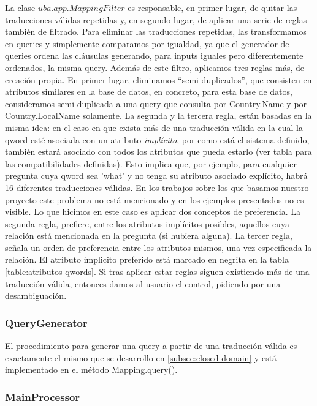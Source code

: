 La clase $uba.app.MappingFilter$ es responsable, en primer lugar, de quitar las traducciones válidas repetidas y, en segundo lugar, de aplicar una serie de reglas también de filtrado. Para eliminar las traducciones repetidas, las transformamos en queries y simplemente comparamos por igualdad, ya que el generador de queries ordena las cláusulas generando, para inputs iguales pero diferentemente ordenados, la misma query.
Además de este filtro, aplicamos tres reglas más, de creación propia. En primer lugar, eliminamos ``semi duplicados'', que consisten en atributos similares en la base de datos, en concreto, para esta base de datos, consideramos semi-duplicada a una query que consulta por Country.Name y por Country.LocalName solamente. La segunda y la tercera regla, están basadas en la misma idea: en el caso en que exista más de una traducción válida en la cual la qword esté asociada con un atributo \textit{implícito}, por como está el sistema definido, también estará asociado con todos los atributos que pueda estarlo (ver tabla  para las compatibilidades definidas). Esto implica que, por ejemplo, para cualquier pregunta cuya qword sea 'what' y no tenga su atributo asociado explícito, habrá 16 diferentes traducciones válidas. En los trabajos sobre los que basamos nuestro proyecto este problema no está mencionado y en los ejemplos presentados no es visible. Lo que hicimos en este caso es aplicar dos conceptos de preferencia. La segunda regla, prefiere, entre los atributos implícitos posibles, aquellos cuya relación está mencionada en la pregunta (si hubiera alguna). La tercer regla, señala un orden de preferencia entre los atributos mismos, una vez especificada la relación. El atributo implicito preferido está marcado en negrita en la tabla \ref{table:atributos-qwords}. Si tras aplicar estar reglas siguen existiendo más de una traducción válida, entonces damos al usuario el control, pidiendo por una desambiguación.


\subsubsection*{QueryGenerator}
\label{subsubsec:query-generator}

El procedimiento para generar una query a partir de una traducción válida es exactamente el mismo que se desarrollo en \ref{subsec:closed-domain} y está implementado en el método Mapping.query().


\subsubsection*{MainProcessor}
\label{subsubsec:main-processor}

